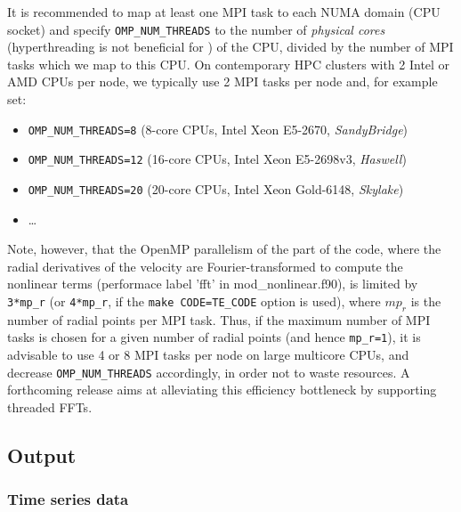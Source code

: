 \documentclass[a4paper, 11pt, DIV=11]{scrartcl}
\begin{document}
It is recommended to map at least one MPI task to each NUMA domain
(CPU socket) and specify \verb+OMP_NUM_THREADS+ to the number of
\emph{physical cores} (hyperthreading is not beneficial for
\nsc) of the CPU, divided by the number of  MPI tasks which we
map to this CPU. On contemporary HPC clusters with 2 Intel or AMD
CPUs per node, we typically use 2 MPI tasks per node and, for example 
set:
\begin{itemize}
\item \verb+OMP_NUM_THREADS=8+ (8-core CPUs, Intel Xeon E5-2670, \emph{SandyBridge})
\item \verb+OMP_NUM_THREADS=12+ (16-core CPUs, Intel Xeon E5-2698v3, \emph{Haswell})
\item \verb+OMP_NUM_THREADS=20+ (20-core CPUs, Intel Xeon Gold-6148, \emph{Skylake}) 
\item \dots
\end{itemize}
Note, however, that the OpenMP parallelism of the part of the code,
where the radial derivatives of the velocity are Fourier-transformed
to compute the nonlinear terms (performace label 'fft' in
mod\_nonlinear.f90), is limited by \verb+3*mp_r+ (or \verb+4*mp_r+, if the
\verb+make CODE=TE_CODE+ option is used), where $mp_r$ is the number of radial points
per MPI task. Thus, if the maximum number of MPI tasks is chosen for a
given number of radial points (and hence \verb+mp_r=1+), it is advisable to use 4 or 8  
MPI tasks per node on large multicore CPUs, and decrease
\verb+OMP_NUM_THREADS+ accordingly, in order not to waste resources.
A forthcoming release aims at alleviating this efficiency bottleneck by
supporting threaded FFTs.

\subsection{Output}
\label{sec:output}

\subsubsection{Time series data}
\label{sec:timeSeries}
\end{document}
